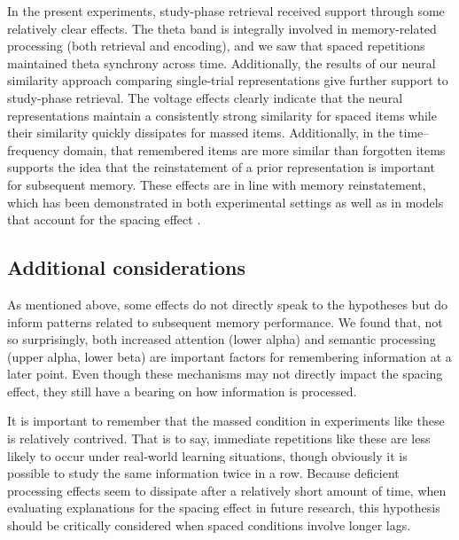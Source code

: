 In the present experiments, study-phase retrieval received support through some relatively clear effects.  The theta band is integrally involved in memory-related processing (both retrieval and encoding), and we saw that spaced repetitions maintained theta synchrony across time.  Additionally, the results of our neural similarity approach comparing single-trial representations give further support to study-phase retrieval.  The voltage effects clearly indicate that the neural representations
maintain a consistently strong similarity for spaced items while their similarity quickly dissipates for massed items.  Additionally, in the time--frequency domain, that remembered items are more similar than forgotten items supports the idea that the reinstatement of a prior representation is important for subsequent memory.
These effects are in line with memory reinstatement, which has been demonstrated in both experimental settings \cite{MannEtal2011} as well as in models that account for the spacing effect \cite{LohnKaha2014b}.

\subsection{Additional considerations}

As mentioned above, some effects do not directly speak to the hypotheses but do inform patterns related to subsequent memory performance.  We found that, not so surprisingly, both increased attention (lower alpha) and semantic processing (upper alpha, lower beta) are important factors for remembering information at a later point.  Even though these mechanisms may not directly impact the spacing effect, they still have a bearing on how information is processed.

It is important to remember that the massed condition in experiments like these is relatively contrived.
That is to say, immediate repetitions like these are less likely to occur under real-world learning situations, though obviously it is possible to study the same information twice in a row.  Because deficient processing effects seem to dissipate after a relatively short amount of time, when evaluating explanations for the spacing effect in future research, this hypothesis should be critically considered when spaced conditions involve longer lags.



